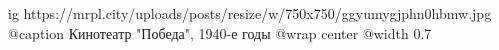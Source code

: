  
 
 
 
 

\ifcmt
  ig https://mrpl.city/uploads/posts/resize/w/750x750/ggyumygjphn0hbmw.jpg
	@caption Кинотеатр "Победа", 1940-е годы
  @wrap center
  @width 0.7
\fi
